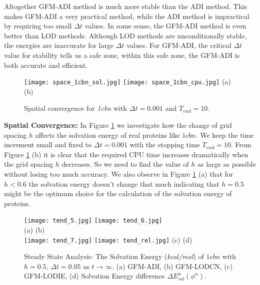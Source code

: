 Altogether GFM-ADI method is much more stable than the ADI method. This makes GFM-ADI a very practical method, while the ADI method is impractical by requiring too small $\Delta t$ values. In some sense, the GFM-ADI method is even better than LOD methods. Although LOD methods are unconditionally stable, the energies are inaccurate for large $\Delta t$ values. For GFM-ADI, the critical $\Delta t$ value for stability tells us a safe zone, within this safe zone, the GFM-ADI is both accurate and efficient. 

\begin{figure}[!ht]
	\begin{center}
	\texttt{[image: space\_1cbn\_sol.jpg]}
	\texttt{[image: space\_1cbn\_cpu.jpg]}	
	(a)\hspace*{3in} (b)\\ 
	\end{center}
	\caption{Spatial convergence for \textit{1cbn} with $\Delta t = 0.001$ and $T_{end} = 10$.}
	\label{fig:space_1cbn}
\end{figure}

{\bf Spatial Convergence:} In Figure \ref{fig:space_1cbn} we investigate how the change of grid spacing $h$ affects the solvation energy of real proteins like $1cbn$. We keep the time increment small and fixed to $ \Delta t = 0.001$ with the stopping time $T_{end} = 10$. From Figure \ref{fig:space_1cbn} (b) it is clear that the required CPU time increases dramatically when the grid spacing $h$ decreases. So we need to find the value of $h$ as large as possible without losing too much accuracy. We also observe in Figure \ref{fig:space_1cbn} (a) that for $h<0.6$ the solvation energy doesn't change that much indicating that $h = 0.5$ might be the optimum choice for the calculation of the solvation energy of proteins. 

\begin{figure}[!h]
	\centering
	\texttt{[image: tend\_5.jpg]}
	\texttt{[image: tend\_6.jpg]}\\
	(a)\hspace*{3in} (b)\\ 
	\texttt{[image: tend\_7.jpg]}
	\texttt{[image: tend\_rel.jpg]}
	(c)\hspace*{3in} (d)
	\caption{Steady State Analysis: The Solvation Energy (\textit{kcal/mol}) of $1cbn$ with $h=0.5$, $\Delta t = 0.05$ as $t\rightarrow \infty$. (a) GFM-ADI, (b) GFM-LODCN, (c) GFM-LODIE, (d) Solvation Energy difference  $\Delta E^n_{sol}(\phi^n)$.}
	\label{fig:tend}
\end{figure}

